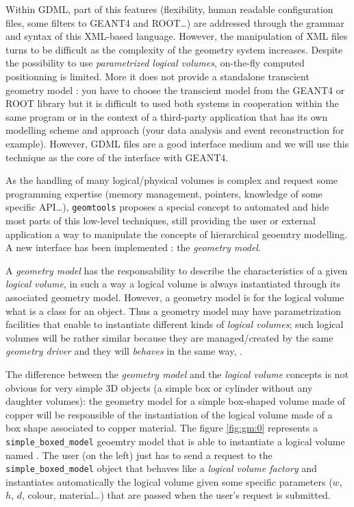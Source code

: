 Within  GDML,  part  of  this features  (flexibility,  human  readable
configuration  files,  some  filters  to  GEANT4  and  ROOT\dots)  are
addressed   through  the   grammar  and   syntax  of   this  XML-based
language. However, the manipulation of XML files turns to be difficult
as  the  complexity of  the  geometry  system  increases. Despite  the
possibility  to use  \emph{parametrized  logical volumes},  on-the-fly
computed  positionning  is  limited.   More  it  does  not  provide  a
standalone  transcient  geometry  model  :  you  have  to  choose  the
transcient model from the GEANT4  or ROOT library but it is difficult 
to used both systems in  cooperation  within  the same  program  
or  in  the context  of  a
third-party application that has its own modelling scheme and approach
(your data  analysis and event reconstruction  for example).  However,
GDML files are a  good interface medium and we will use this technique
 as the core of the interface with GEANT4.

As  the  handling of  many  logical/physical  volumes  is complex  and
request some programming expertise (memory management, pointers, knowledge
of some specific API\dots),
\texttt{geomtools} proposes a special concept to automated and hide
most parts of  this low-level techniques, still providing  the user or
external application a way  to manipulate the concepts of hierarchical
geoemtry  modelling.  A  new  interface  has been  implemented  :  the
\emph{geometry model}.

A  \emph{geometry  model}  has  the  responsability  to  describe  the
characteristics  of a  given \emph{logical  volume}, in  such a  way a
logical volume is always  instantiated through its associated geometry
model. However, a  geometry model is for the logical  volume what is a
class for  an object.  Thus  a geometry model may  have parametrization
facilities that enable to  instantiate different kinds of \emph{logical
  volumes}; such logical volumes will be rather similar because 
they are managed/created by the same \emph{geometry driver} and 
they will \emph{behaves} in the same way, .

The difference between the \emph{geometry model} and the \emph{logical
  volume} concepts is not obvious for very simple 3D objects (a simple
box or cylinder without any  daughter volumes): the geometry model for
a simple box-shaped  volume made of copper will  be responsible of the
instantiation of the logical volume  made of a box shape associated to
copper     material.     The      figure     \ref{fig:gm:0}     represents     a
\texttt{simple\_boxed\_model}   geoemtry  model   that   is  able   to
instantiate a logical volume  named .  The user (on
the    left)    just    has    to    send    a    request    to    the
\texttt{simple\_boxed\_model} object that behaves like a \emph{logical
  volume     factory}    and     instantiates     automatically    the
  logical  volume  given some  specific  parameters
($w$, $h$, $d$, colour, material\dots) that are passed when the user's
request is submitted.

